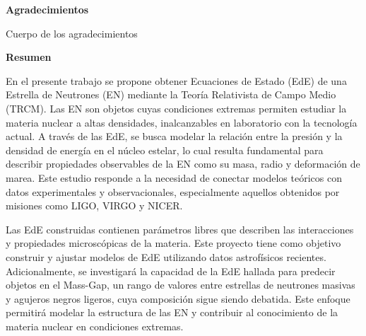 \documentclass[8pt, letterpaper]{report}
\begin{document}
\clearpage
\thispagestyle{empty}
\vspace*{\fill}
\begin{flushleft}
    {\huge\bfseries Agradecimientos\par}
    \vspace{0.5cm}
	Cuerpo de los agradecimientos
    
\end{flushleft}
\vspace*{\fill}
\clearpage



\pagestyle{empty}
\tableofcontents


\clearpage
\listoffigures
\clearpage

\clearpage
\vspace*{1cm} %
\begin{flushleft}
    {\huge\bfseries Resumen\par}
    \vspace{0.5cm}
    En el presente trabajo se propone obtener Ecuaciones de Estado (EdE) de una Estrella de Neutrones (EN) mediante la Teoría Relativista de Campo Medio (TRCM). Las EN son objetos cuyas condiciones extremas permiten estudiar la materia nuclear a altas densidades, inalcanzables en laboratorio con la tecnología actual. A través de las EdE, se busca modelar la relación entre  la presión y la densidad de energía en el núcleo estelar, lo cual resulta fundamental para describir propiedades observables de la EN como su masa,  radio y  deformación de marea. Este estudio responde a la necesidad de conectar modelos teóricos con datos experimentales y observacionales, especialmente  aquellos obtenidos por misiones como LIGO, VIRGO y NICER.
    
    Las EdE construidas contienen parámetros libres que describen las interacciones y propiedades microscópicas de la materia. Este proyecto tiene como objetivo construir y ajustar modelos de EdE utilizando datos astrofísicos recientes. Adicionalmente, se investigará la capacidad de la EdE hallada para predecir objetos en el Mass-Gap, un rango de valores entre estrellas de neutrones masivas y agujeros negros ligeros, cuya composición sigue siendo debatida. Este enfoque permitirá modelar la estructura de las EN y contribuir al conocimiento de la materia nuclear en condiciones extremas.

    
\end{flushleft}
\end{document}
